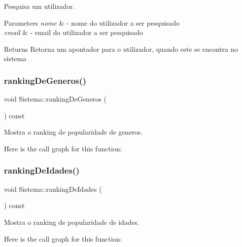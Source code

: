 Pesquisa um utilizador. 


\begin{DoxyParams}{Parameters}
{\em nome} & -\/ nome do utilizador a ser pesquisado \\
\hline
{\em email} & -\/ email do utilizador a ser pesquisado \\
\hline
\end{DoxyParams}
\begin{DoxyReturn}{Returns}
Retorna um apontador para o utilizador, quando este se encontra no sistema 
\end{DoxyReturn}
\mbox{\label{class_sistema_afc03af6008df8639b1d1878388f70886}} 
\subsubsection{\texorpdfstring{ranking\+De\+Generos()}{rankingDeGeneros()}}
{\footnotesize\ttfamily void Sistema\+::ranking\+De\+Generos (\begin{DoxyParamCaption}{ }\end{DoxyParamCaption}) const}



Mostra o ranking de popularidade de generos. 

Here is the call graph for this function\+:
\mbox{\label{class_sistema_a922993ab8f9dd2e8eb853edf3172543b}} 
\subsubsection{\texorpdfstring{ranking\+De\+Idades()}{rankingDeIdades()}}
{\footnotesize\ttfamily void Sistema\+::ranking\+De\+Idades (\begin{DoxyParamCaption}{ }\end{DoxyParamCaption}) const}



Mostra o ranking de popularidade de idades. 

Here is the call graph for this function\+:
\mbox{\label{class_sistema_a6e4c08a6ee3c8f5721e46f64823fd6a3}} 
